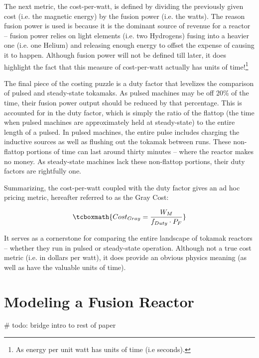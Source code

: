 The next metric, the cost-per-watt, is defined by dividing the previously given cost (i.e. the magnetic energy) by the fusion power (i.e. the watts). The reason fusion power is used is because it is the dominant source of revenue for a reactor -- fusion power relies on light elements (i.e. two Hydrogens) fusing into a heavier one (i.e. one Helium) and releasing enough energy to offset the expense of causing it to happen. Although fusion power will not be defined till later, it does highlight the fact that this measure of cost-per-watt actually has units of time!\footnote{As energy per unit watt has units of time (i.e seconds).}

The final piece of the costing puzzle is a duty factor that levelizes the comparison of pulsed and steady-state tokamaks. As pulsed machines may be off 20\% of the time, their fusion power output should be reduced by that percentage. This is accounted for in the duty factor, which is simply the ratio of the flattop (the time when pulsed machines are approximately held at steady-state) to the entire length of a pulsed. In pulsed machines, the entire pulse includes charging the inductive sources as well as flushing out the tokamak between runs. These non-flattop portions of time can last around thirty minutes -- where the reactor makes no money. As steady-state machines lack these non-flattop portions, their duty factors are rightfully one.

Summarizing, the cost-per-watt coupled with the duty factor gives an ad hoc pricing metric, hereafter referred to as the Gray Cost:

\begin{equation}
	\tcboxmath{
	Cost_{Gray} = \frac{W_M}{f_{Duty} \cdot P_F}
	}
\end{equation}

It serves as a cornerstone for comparing the entire landscape of tokamak reactors -- whether they run in pulsed or steady-state operation. Although not a true cost metric (i.e. in dollars per watt), it does provide an obvious physics meaning (as well as have the valuable units of time).

\section{Modeling a Fusion Reactor}

\# todo: bridge intro to rest of paper

%
